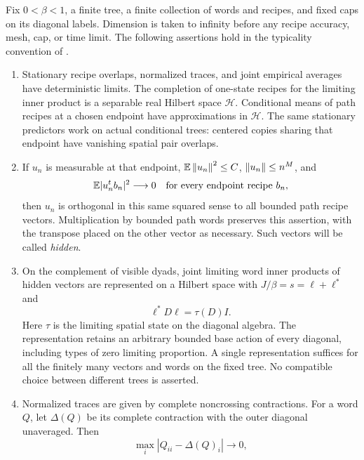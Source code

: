 \begin{theorem}
\label{thm:path-calculus}
Fix $0<\beta<1$, a finite tree, a finite collection of words and
recipes, and fixed caps on its diagonal labels.  Dimension is taken
to infinity before any recipe accuracy, mesh, cap, or time limit.
The following assertions hold in the typicality convention of
.
\begin{enumerate}[label=(\roman*)]
\item Stationary recipe overlaps, normalized traces, and joint empirical
averages have deterministic limits.  The completion of one-state
recipes for the limiting inner product is a separable real Hilbert
space $\mathcal H$.  Conditional means of path recipes at a chosen
endpoint have approximations in $\mathcal H$.  The same stationary
predictors work on actual conditional trees: centered copies sharing
that endpoint have vanishing spatial pair overlaps.
\item If $u_n$ is measurable at that endpoint,
$\mathbb E\left\lVert u_n\right\rVert^2\le C$, $\left\lVert u_n\right\rVert\le n^M$, and
\begin{equation}
 \mathbb E|u_n^tb_n|^2\longrightarrow0
 \quad\text{for every endpoint recipe }b_n,
 \label{eq:path-hidden}
\end{equation}
then $u_n$ is orthogonal in this same squared sense to all bounded
path recipe vectors.  Multiplication by bounded path words preserves
this assertion, with the transpose placed on the other vector as
necessary.  Such vectors will be called \emph{hidden}.
\item On the complement of visible dyads, joint limiting word inner
products of hidden vectors are represented on a Hilbert space with
$J/\beta=s=\ell+\ell^*$ and
\begin{equation}
 \ell^*D\ell=\tau(D)I.
 \label{eq:path-creation}
\end{equation}
Here $\tau$ is the limiting spatial state on the diagonal algebra.
The representation retains an arbitrary bounded base action of every
diagonal, including types of zero limiting proportion.  A single
representation suffices for all the finitely many vectors and words
on the fixed tree.  No compatible choice between different trees is
asserted.
\item Normalized traces are given by complete noncrossing contractions.
For a word $Q$, let $\Delta(Q)$ be its complete contraction with the
outer diagonal unaveraged.  Then
\begin{equation}
 \max_i|Q_{ii}-\Delta(Q)_i|\longrightarrow0,

\end{equation}
\end{enumerate}
\end{theorem}
